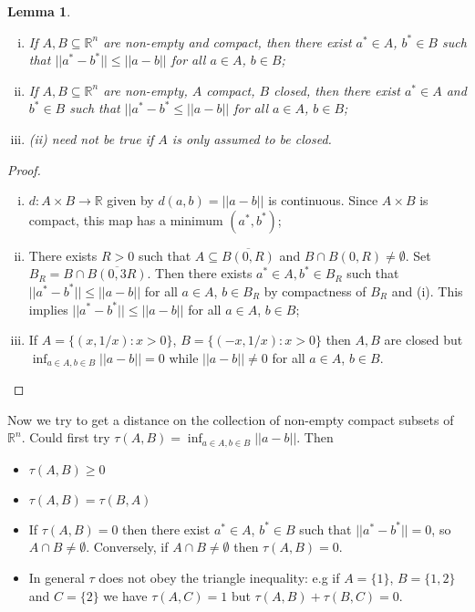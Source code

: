 \documentclass[a4paper, 10pt, twocolumn]{amsart}
\newtheorem*{lemma}{Lemma}
\theoremstyle{definition}
\newcommand{\bb}[1]{\mathbb{#1}}
\newcommand{\sbs}[0]{\subseteq}
\newcommand{\1}{\mathbbm{1}}
\begin{document}
\begin{lemma}
    \ \begin{enumerate}[(i)]
        \item If $A,B \sbs \bb{R}^n$ are non-empty and compact, then there exist $a^\ast \in A$, $b^\ast \in B$ such that $||a^\ast-b^\ast|| \le ||a-b||$ for all $a \in A$, $b \in B$;
        \item If $A,B \sbs \bb{R}^n$ are non-empty, $A$ compact, $B$ closed, then there exist $a^\ast\in A$ and $b^\ast \in B$ such that $||a^\ast-b^\ast \le ||a-b||$ for all $a \in A$, $b \in B$;
        \item (ii) need not be true if $A$ is only assumed to be closed.
    \end{enumerate}
\end{lemma}

\begin{proof}
    \ \begin{enumerate}[(i)]
        \item $d: A \times B \to \bb{R}$ given by $d(a,b) = ||a-b||$ is continuous. Since $A \times B$ is compact, this map has a minimum $(a^\ast,b^\ast)$;
        \item There exists $R>0$ such that $A \sbs \overline{B(0,R)}$ and $B\cap B(0,R) \ne\emptyset$. Set $B_R = B \cap \overline{B(0,3R)}$. Then there exists $a^\ast\in A,b^\ast \in B_R$ such that $||a^\ast-b^\ast|| \le ||a-b||$ for all $a\in A$, $b \in B_R$ by compactness of $B_R$ and (i). This implies $||a^\ast-b^\ast|| \le ||a-b||$ for all $a\in A$, $b \in B$;
        \item If $A =\{(x,1/x):x>0\}$, $B = \{(-x,1/x):x>0\}$ then $A,B$ are closed but $\inf_{a\in A,b\in B}||a-b||=0$ while $||a-b|| \ne 0$ for all $a \in A$, $b \in B$. 
    \end{enumerate}
\end{proof}

Now we try to get a distance on the collection of non-empty compact subsets of $\bb{R}^n$. Could first try $\tau(A,B) = \inf_{a\in A,b\in B} ||a-b||$. Then \begin{itemize}
    \item $\tau(A,B) \ge 0$
    \item $\tau(A,B) = \tau(B,A)$
    \item If $\tau(A,B) =0$ then there exist $a^\ast \in A$, $b^\ast \in B$ such that $||a^\ast-b^\ast|| = 0$, so $A \cap B \ne \emptyset$. Conversely, if $A \cap B \ne \emptyset$ then $\tau(A,B) = 0$. 
    \item In general $\tau$ does not obey the triangle inequality: e.g if $A = \{1\}$, $B = \{1,2\}$ and $C= \{2\}$ we have $\tau(A,C) = 1$ but $\tau(A,B)+\tau(B,C) = 0$.
\end{itemize}
\end{document}
